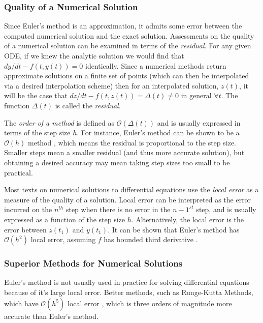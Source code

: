 \subsubsection{Quality of a Numerical Solution}

Since Euler's method is an approximation, it admits some error between the computed numerical solution and the exact solution.  Assessments on the quality of a numerical solution can be examined in terms of the \textit{residual}.  For any given ODE, if we knew the analytic solution we would find that $ dy/dt - f(t,y(t))= 0 $ identically.  Since a numerical methods return approximate solutions on a finite set of points (which can then be interpolated via a desired interpolation scheme) then for an interpolated solution, $ z(t) $, it will be the case that $ dz/dt - f(t,z(t)) = \Delta (t) \neq 0$ in general $ \forall t $.  The function $ \Delta (t) $ is called the \textit{residual}.

The \textit{order of a method} is defined as $ \mathcal{O}(\Delta (t)) $ and is usually expressed in terms of the step size $ h $.  For instance, Euler's method can be shown to be a $ \mathcal{O}(h) $ method \cite{corless2013graduate}, which means the residual is proportional to the step size.  Smaller steps mean a smaller residual (and thus more accurate solution), but obtaining a desired accuracy may mean taking step sizes too small to be practical.

Most texts on numerical solutions to differential equations use the \textit{local error} as a measure of the quality of a solution.  Local error can be interpreted as the error incurred on the $ n^{th} $ step when there is no error in the $ n-1^{st} $ step, and is usually expressed as a function of the step size $ h $.  Alternatively, the local error is the error between $ z(t_1) $ and $ y(t_1) $. It can be shown that Euler's method has $ \mathcal{O}(h^2) $ local error, assuming $ f $ has bounded third derivative \cite{corless2013graduate}.

\subsubsection{Superior Methods for Numerical Solutions}

Euler's method is not usually used in practice for solving differential equations because of it's large local error.  Better methods, such as Runge-Kutta Methods, which have  $ \mathcal{O}(h^5) $ local error \cite{boyce2012differential}, which is three orders of magnitude more accurate than Euler's method.

